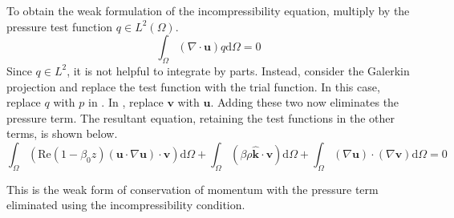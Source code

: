 \documentclass[12pt]{article}
\begin{document}
To obtain the weak formulation of the incompressibility equation, multiply by the pressure test function $q\in L^2(\Omega)$.
\begin{equation}
\label{eq:incompweakformprediff}
\int_\Omega(\nabla\cdot\mathbf{u})q\text{d}\Omega=0
\end{equation}
Since $q\in L^2$, it is not helpful to integrate by parts. Instead, consider the Galerkin projection and replace the test function with the trial function. In this case, replace $q$ with $p$ in . In , replace $\mathbf{v}$ with $\mathbf{u}$. Adding these two now eliminates the pressure term. The resultant equation, retaining the test functions in the other terms, is shown below.
\begin{equation}
\label{eq:weakmomentumelim}
\int_\Omega(\text{Re}(1-\beta_0z)(\mathbf{u}\cdot\nabla\mathbf{u})\cdot\mathbf{v})\text{d}\Omega+\int_\Omega(\beta\rho\mathbf{\hat{k}}\cdot\mathbf{v})\text{d}\Omega+\int_\Omega(\nabla\mathbf{u})\cdot(\nabla\mathbf{v})\text{d}\Omega=0
\end{equation}

This is the weak form of conservation of momentum with the pressure term eliminated using the incompressibility condition. %
\end{document}
